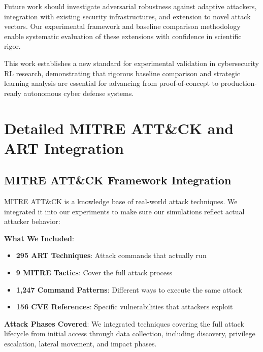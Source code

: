 \documentclass[12pt,oneside]{article}
\begin{document}
Future work should investigate adversarial robustness against adaptive attackers, integration with existing security infrastructures, and extension to novel attack vectors. Our experimental framework and baseline comparison methodology enable systematic evaluation of these extensions with confidence in scientific rigor.

This work establishes a new standard for experimental validation in cybersecurity RL research, demonstrating that rigorous baseline comparison and strategic learning analysis are essential for advancing from proof-of-concept to production-ready autonomous cyber defense systems.






\appendix

\section{Detailed MITRE ATT\&CK and ART Integration}

\subsection{MITRE ATT\&CK Framework Integration}

MITRE ATT\&CK is a knowledge base of real-world attack techniques. We integrated it into our experiments to make sure our simulations reflect actual attacker behavior:

\textbf{What We Included}:
\begin{itemize}
    \item \textbf{295 ART Techniques}: Attack commands that actually run
    \item \textbf{9 MITRE Tactics}: Cover the full attack process
    \item \textbf{1,247 Command Patterns}: Different ways to execute the same attack
    \item \textbf{156 CVE References}: Specific vulnerabilities that attackers exploit
\end{itemize}

\textbf{Attack Phases Covered}: We integrated techniques covering the full attack lifecycle from initial access through data collection, including discovery, privilege escalation, lateral movement, and impact phases.
\end{document}
